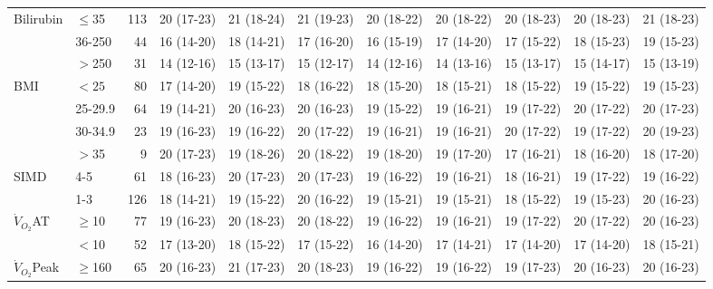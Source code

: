 \begin{sidewaystable}[p]
\begin{tabular}{|llr | c c c c c c c c|}
		Bilirubin           & $\leq$35  & 113 & 20 (17-23) & 21 (18-24) & 21 (19-23) & 20 (18-22) & 20 (18-22) & 20 (18-23) & 20 (18-23) & 21 (18-23) \\
		                    & 36-250    &  44 & 16 (14-20) & 18 (14-21) & 17 (16-20) & 16 (15-19) & 17 (14-20) & 17 (15-22) & 18 (15-23) & 19 (15-23) \\
		                    & $>$250    &  31 & 14 (12-16) & 15 (13-17) & 15 (12-17) & 14 (12-16) & 14 (13-16) & 15 (13-17) & 15 (14-17) & 15 (13-19) \\
		BMI                 & $<25$     &  80 & 17 (14-20) & 19 (15-22) & 18 (16-22) & 18 (15-20) & 18 (15-21) & 18 (15-22) & 19 (15-22) & 19 (15-23) \\
		                    & 25-29.9   &  64 & 19 (14-21) & 20 (16-23) & 20 (16-23) & 19 (15-22) & 19 (16-21) & 19 (17-22) & 20 (17-22) & 20 (17-23) \\
		                    & 30-34.9   &  23 & 19 (16-23) & 19 (16-22) & 20 (17-22) & 19 (16-21) & 19 (16-21) & 20 (17-22) & 19 (17-22) & 20 (19-23) \\
		                    & $>$35     &   9 & 20 (17-23) & 19 (18-26) & 20 (18-22) & 19 (18-20) & 19 (17-20) & 17 (16-21) & 18 (16-20) & 18 (17-20) \\
		SIMD                & 4-5       &  61 & 18 (16-23) & 20 (17-23) & 20 (17-23) & 19 (16-22) & 19 (16-21) & 18 (16-21) & 19 (17-22) & 19 (16-22) \\
		                    & 1-3       & 126 & 18 (14-21) & 19 (15-22) & 20 (16-22) & 19 (15-21) & 19 (15-21) & 18 (15-22) & 19 (15-23) & 20 (16-23) \\
		$\dot{V}_{O_2}$AT   & $\geq$10  &  77 & 19 (16-23) & 20 (18-23) & 20 (18-22) & 19 (16-22) & 19 (16-21) & 19 (17-22) & 20 (17-22) & 20 (16-23) \\
		                    & $<$10     &  52 & 17 (13-20) & 18 (15-22) & 17 (15-22) & 16 (14-20) & 17 (14-21) & 17 (14-20) & 17 (14-20) & 18 (15-21) \\
		$\dot{V}_{O_2}$Peak & $\geq$160 &  65 & 20 (16-23) & 21 (17-23) & 20 (18-23) & 19 (16-22) & 19 (16-22) & 19 (17-23) & 20 (16-23) & 20 (16-23) \\

\end{tabular}
\end{sidewaystable}
